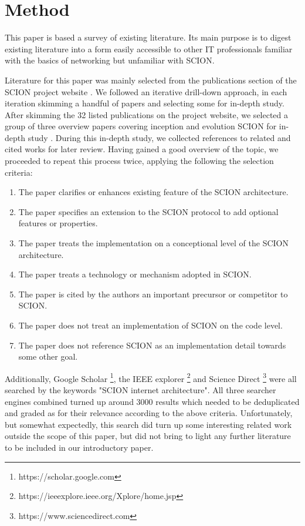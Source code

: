 \documentclass[../eva1_scion.tex]{subfiles}
\begin{document}
\section{Method}\label{sec:method}

    This paper is based a survey of existing literature. Its main purpose is to digest existing literature into a form easily accessible to other IT professionals familiar with the basics of networking but unfamiliar with SCION.

       Literature for this paper was mainly selected from the publications section of the SCION project website \cite{scion_website}. We followed an iterative drill-down approach, in each iteration skimming a handful of papers and selecting some for in-depth study. After skimming the 32 listed publications on the project website, we selected a group of three overview papers covering inception and evolution SCION for in-depth study \cite{scion_2011, scion_2015, scion_2017}. During this in-depth study, we collected references to related and cited works for later review. Having gained a good overview of the topic, we proceeded to repeat this process twice, applying the following the selection criteria:

    \begin{enumerate}
        \item The paper clarifies or enhances existing feature of the SCION architecture.
        \item The paper specifies an extension to the SCION protocol to add optional features or properties.
        \item The paper treats the implementation on a conceptional level of the SCION architecture.
        \item The paper treats a technology or mechanism adopted in SCION.
        \item The paper is cited by the authors an important precursor or competitor to SCION.
        \item The paper does not treat an implementation of SCION on the code level.
        \item The paper does not reference SCION as an implementation detail towards some other goal.
    \end{enumerate}

    Additionally, Google Scholar \footnote{https://scholar.google.com}, the IEEE explorer \footnote{https://ieeexplore.ieee.org/Xplore/home.jsp} and Science Direct \footnote{https://www.sciencedirect.com} were all searched by the keywords "SCION internet architecture". All three searcher engines combined turned up around 3000 results which needed to be deduplicated and graded as for their relevance according to the above criteria. Unfortunately, but somewhat expectedly, this search did turn up some interesting related work outside the scope of this paper, but did not bring to light any further literature to be included in our introductory paper.
\end{document}
